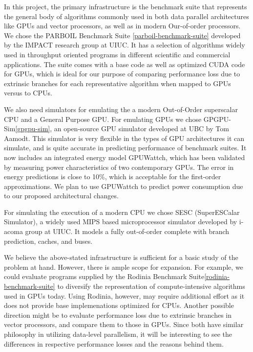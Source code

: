 \par{
In this project, the primary infrastructure is the benchmark suite that represents the general body of algorithms commonly used in both data parallel architectures like GPUs and vector processors, as well as in modern Our-of-order processors. We chose the PARBOIL Benchmark Suite \ref{parboil-benchmark-suite} developed by the IMPACT research group at UIUC. It has a selection of algorithms widely used in throughput oriented programs in different scientific and commercial applications. The suite comes with a base code as well as optimized CUDA code for GPUs, which is ideal for our purpose of comparing performance loss due to extrinsic branches for each representative algorithm when mapped to GPUs versus to CPUs.
}

\par{
We also need simulators for emulating the a modern Out-of-Order superscalar CPU and a General Purpose GPU. For emulating GPUs we chose GPGPU-Sim\ref{gpgpu-sim}, an open-source GPU simulator developed at UBC by Tom Aamodt. This simulator is very flexible in the types of GPU architectures it can simulate, and is quite accurate in predicting performance of benchmark suites. It now includes an integrated energy model GPUWattch, which has been validated by measuring power characteristics of two contemporary GPUs. The error in energy predictions is close to 10\%, which is acceptable for the first-order approximations. We plan to use GPUWattch to predict power consumption due to our proposed architectural changes.
}

\par{
For simulating the execution of a modern CPU we chose SESC (SuperESCalar Simulator), a widely used MIPS based microprocessor simulator developed by i-acoma group at UIUC. It models a fully out-of-order complete with branch prediction, caches, and buses.
}

\par{We believe the above-stated infrastructure is sufficient for a basic study of the problem at hand. However, there is ample scope for expansion. For example, we could evaluate programs supplied by the Rodinia Benchmark Suite\ref{rodinia-benchmark-suite} to diversify the representation of compute-intensive algorithms used in GPUs today. Using Rodinia, however, may require additional effort as it does not provide base implemenations optimized for CPUs. Another possible direction might be to evaluate performance loss due to extrinsic branches in vector processors, and compare them to those in GPUs. Since both have similar philosophy in utilizing data-level parallelism, it will be interesting to see the differences in respective performance losses and the reasons behind them.}
